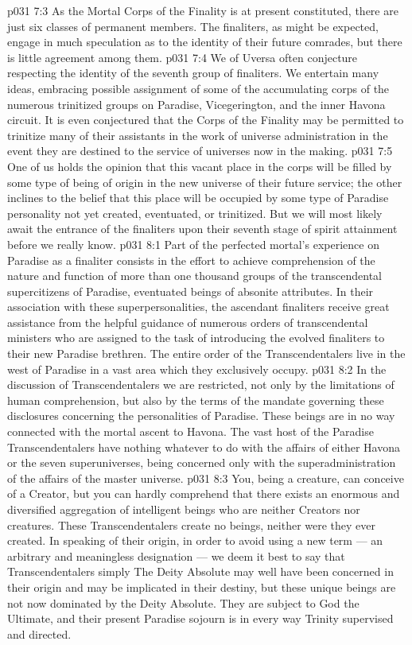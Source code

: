 \vs p031 7:3 \pc As the Mortal Corps of the Finality is at present constituted, there are just six classes of permanent members. The finaliters, as might be expected, engage in much speculation as to the identity of their future comrades, but there is little agreement among them.
\vs p031 7:4 We of Uversa often conjecture respecting the identity of the seventh group of finaliters. We entertain many ideas, embracing possible assignment of some of the accumulating corps of the numerous trinitized groups on Paradise, Vicegerington, and the inner Havona circuit. It is even conjectured that the Corps of the Finality may be permitted to trinitize many of their assistants in the work of universe administration in the event they are destined to the service of universes now in the making.
\vs p031 7:5 One of us holds the opinion that this vacant place in the corps will be filled by some type of being of origin in the new universe of their future service; the other inclines to the belief that this place will be occupied by some type of Paradise personality not yet created, eventuated, or trinitized. But we will most likely await the entrance of the finaliters upon their seventh stage of spirit attainment before we really know.
\vs p031 8:1 Part of the perfected mortal’s experience on Paradise as a finaliter consists in the effort to achieve comprehension of the nature and function of more than one thousand groups of the transcendental supercitizens of Paradise, eventuated beings of absonite attributes. In their association with these superpersonalities, the ascendant finaliters receive great assistance from the helpful guidance of numerous orders of transcendental ministers who are assigned to the task of introducing the evolved finaliters to their new Paradise brethren. The entire order of the Transcendentalers live in the west of Paradise in a vast area which they exclusively occupy.
\vs p031 8:2 In the discussion of Transcendentalers we are restricted, not only by the limitations of human comprehension, but also by the terms of the mandate governing these disclosures concerning the personalities of Paradise. These beings are in no way connected with the mortal ascent to Havona. The vast host of the Paradise Transcendentalers have nothing whatever to do with the affairs of either Havona or the seven superuniverses, being concerned only with the superadministration of the affairs of the master universe.
\vs p031 8:3 You, being a creature, can conceive of a Creator, but you can hardly comprehend that there exists an enormous and diversified aggregation of intelligent beings who are neither Creators nor creatures. These Transcendentalers create no beings, neither were they ever created. In speaking of their origin, in order to avoid using a new term --- an arbitrary and meaningless designation --- we deem it best to say that Transcendentalers simply  The Deity Absolute may well have been concerned in their origin and may be implicated in their destiny, but these unique beings are not now dominated by the Deity Absolute. They are subject to God the Ultimate, and their present Paradise sojourn is in every way Trinity supervised and directed.
